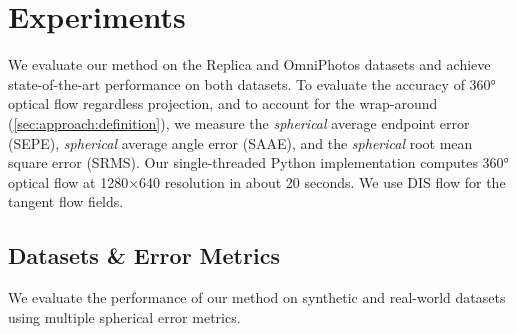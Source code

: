 \section{Experiments}
\label{sec:exp}

We evaluate our method on the Replica \cite{StrauWMCWGEMRVCYBYPYZLCBGMPSBSNGLN2019} and OmniPhotos \cite{BerteYLR2020} datasets and achieve state-of-the-art performance on both datasets.
%
To evaluate the accuracy of 360° optical flow regardless projection, and to account for the wrap-around (\cref{sec:approach:definition}), we measure the \emph{spherical} average endpoint error (SEPE), \emph{spherical} average angle error (SAAE), and the \emph{spherical} root mean square error (SRMS).
%
Our single-threaded Python implementation computes 360° optical flow at 1280$\times$640 resolution in about 20 seconds.
We use DIS flow \cite{KroegTDV2016} for the tangent flow fields.


\subsection{Datasets \& Error Metrics}
\label{sec:datasets-metrics}

We evaluate the performance of our method on synthetic and real-world datasets using multiple spherical error metrics.

\vspace{-1em}
